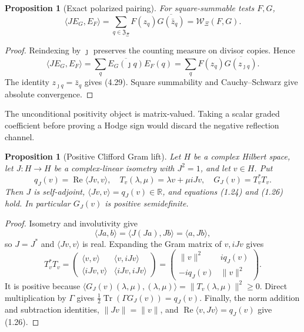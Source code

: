 \documentclass[11pt,reqno]{amsart}
\newtheorem{proposition}[theorem]{Proposition}
\newcommand{\R}{\mathbb R}
\newcommand{\Tr}{\operatorname{Tr}}
\begin{document}
\begin{proposition}[Exact polarized pairing]\label{prop:weilpairing}
For square-summable tests $F,G$,
\[
 \langle JE_G,E_F\rangle
 =\sum_{q\in\mathfrak Z_\Xi}F(z_q)\overline{G(\bar z_q)}
 =\mathcal W_\Xi(F,G).                                \tag{4.29}
\]
\end{proposition}

\begin{proof}
Reindexing by $\jmath$ preserves the counting measure on divisor copies.  Hence
\[
 \langle JE_G,E_F\rangle
 =\sum_q\overline{E_G(\jmath q)}E_F(q)
 =\sum_qF(z_q)\overline{G(z_{\jmath q})}.
\]
The identity $z_{\jmath q}=\bar z_q$ gives (4.29).  Square summability and
Cauchy--Schwarz give absolute convergence.
\end{proof}

The unconditional positivity object is matrix-valued.  Taking a scalar graded coefficient before
proving a Hodge sign would discard the negative reflection channel.

\begin{proposition}[Positive Clifford Gram lift]\label{prop:gramlift}
Let $H$ be a complex Hilbert space, let $J:H\to H$ be a complex-linear isometry with $J^2=1$, and
let $v\in H$.  Put
\[
 q_J(v)=\operatorname{Re}\langle Jv,v\rangle,\quad
 T_v(\lambda,\mu)=\lambda v+\mu iJv,\quad G_J(v)=T_v^*T_v.
\]
Then $J$ is self-adjoint, $\langle Jv,v\rangle=q_J(v)\in\R$, and equations
\textup{(1.24)} and \textup{(1.26)} hold.  In particular $G_J(v)$ is positive semidefinite.
\end{proposition}

\begin{proof}
Isometry and involutivity give
\[
             \langle Ja,b\rangle
             =\langle J(Ja),Jb\rangle
             =\langle a,Jb\rangle,                   \tag{4.30}
\]
so $J=J^*$ and $\langle Jv,v\rangle$ is real.  Expanding the Gram matrix of $v,iJv$ gives
\[
 T_v^*T_v=
 \begin{pmatrix}
 \langle v,v\rangle&\langle v,iJv\rangle\\
 \langle iJv,v\rangle&\langle iJv,iJv\rangle
 \end{pmatrix}
 =\begin{pmatrix}\|v\|^2&iq_J(v)\\-iq_J(v)&\|v\|^2\end{pmatrix}.
\]
It is positive because
$\langle G_J(v)(\lambda,\mu),(\lambda,\mu)\rangle
=\|T_v(\lambda,\mu)\|^2\ge0$.  Direct multiplication by $\Gamma$ gives
$\frac12\Tr(\Gamma G_J(v))=q_J(v)$.  Finally, the norm addition and subtraction identities,
$\|Jv\|=\|v\|$, and
$\operatorname{Re}\langle v,Jv\rangle=q_J(v)$ give (1.26).
\end{proof}
\end{document}

